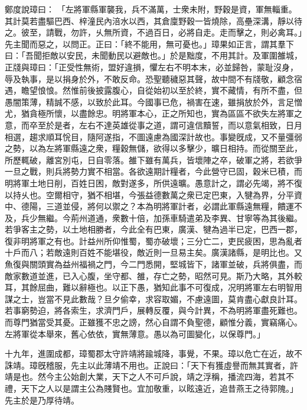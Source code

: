 \begin{pinyinscope}
 
鄭度說璋曰：
 「左將軍縣軍襲我，兵不滿萬，士衆未附，野穀是資，軍無輜重。其計莫若盡驅巴西、梓潼民內涪水以西，其倉廩野穀一皆燒除，高壘深溝，靜以待之。彼至，請戰，勿許，乆無所資，不過百日，必將自走。走而擊之，則必禽耳。」先主聞而惡之，以問正。正曰：「終不能用，無可憂也。」璋果如正言，謂其羣下曰：「吾聞拒敵以安民，未聞動民以避敵也。」於是黜度，不用其計。及軍圍雒城，正牋與璋曰：「正受性無術，盟好違損，懼左右不明本末，必並歸咎，蒙耻沒身，辱及執事，是以捐身於外，不敢反命。恐聖聽穢惡其聲，故中間不有牋敬，顧念宿遇，瞻望悢悢。然惟前後披露腹心，自從始初以至於終，實不藏情，有所不盡，但愚闇策薄，精誠不感，以致於此耳。今國事已危，禍害在速，雖捐放於外，言足憎尤，猶貪極所懷，以盡餘忠。明將軍本心，正之所知也，實為區區不欲失左將軍之意，而卒至於是者，左右不達英雄從事之道，謂可違信黷誓，而以意氣相致，日月相選，趨求順耳恱目，隨阿遂指，不圖遠慮為國深計故也。事變旣成，又不量彊弱之勢，以為左將軍縣遠之衆，糧穀無儲，欲得以多擊少，曠日相持。而從關至此，所歷輒破，離宮別屯，日自零落。雒下雖有萬兵，皆壞陣之卒，破軍之將，若欲爭一旦之戰，則兵將勢力實不相當。各欲遠期計糧者，今此營守已固，穀米已積，而明將軍土地日削，百姓日困，敵對遂多，所供遠曠。愚意計之，謂必先竭，將不復以持乆也。空爾相守，猶不相堪，今張益德數萬之衆已定巴東，入犍為界，分平資中、德陽，三道並侵，將何以禦之？本為明將軍計者，必謂此軍縣遠無糧，饋運不及，兵少無繼。今荊州道通，衆數十倍，加孫車騎遣弟及李異、甘寧等為其後繼。若爭客主之勢，以土地相勝者，今此全有巴東，廣漢、犍為過半已定，巴西一郡，復非明將軍之有也。計益州所仰惟蜀，蜀亦破壞；三分亡二，吏民疲困，思為亂者十戶而八；若敵遠則百姓不能堪役，敵近則一旦易主矣。廣漢諸縣，是明比也。又魚復與關頭實為益州福禍之門，今二門悉開，堅城皆下，諸軍並破，兵將俱盡，而敵家數道並進，已入心腹，坐守都、雒，存亡之勢，昭然可見。斯乃大略，其外較耳，其餘屈曲，難以辭極也。以正下愚，猶知此事不可復成，况明將軍左右明智用謀之士，豈當不見此數哉？旦夕偷幸，求容取媚，不慮遠圖，莫肯盡心獻良計耳。若事窮勢迫，將各索生，求濟門戶，展轉反覆，與今計異，不為明將軍盡死難也。而尊門猶當受其憂。正雖獲不忠之謗，然心自謂不負聖德，顧惟分義，實竊痛心。左將軍從本舉來，舊心依依，實無薄意。愚以為可圖變化，以保尊門。」
 
 
十九年，進圍成都，璋蜀郡太守許靖將踰城降，事覺，不果。璋以危亡在近，故不誅靖。璋旣稽服，先主以此薄靖不用也。正說曰：「天下有獲虛譽而無其實者，許靖是也。然今主公始創大業，天下之人不可戶說，靖之浮稱，播流四海，若其不禮，天下之人以是謂主公為賤賢也。宜加敬重，以眩遠近，追昔燕王之待郭隗。」先主於是乃厚待靖。
 

\end{pinyinscope}
